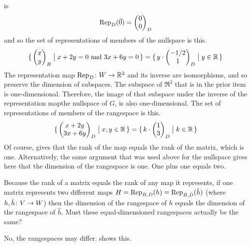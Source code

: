\begin{exercises}
\begin{answer}
\begin{exparts}
           is 
           \begin{equation*}
             \rep{\zero}{D}=\colvec{0 \\ 0}_D
           \end{equation*}
           and so the set of representations of members of the nullspace is
           this.
           \begin{equation*}
             \set{\colvec{x \\ y}_B\suchthat \text{$x+2y=0$ and $3x+6y=0$}}
             =\set{y\cdot\colvec{-1/2 \\ 1}_D\suchthat y\in\Re}
           \end{equation*}
         \partsitem The representation map $\map{\mbox{Rep}_D}{W}{\Re^2}$
           and its inverse
           are isomorphisms, and so preserve the dimension of subspaces.
           The subspace of $\Re^2$ that is in the prior item is
           one-dimensional.
           Therefore, the image of that subspace under the inverse of the
           representation map\Dash the nullspace of $G$, 
           is also one-dimensional.
         \partsitem The set of representations of members of the rangespace is
           this.
           \begin{equation*}
             \set{\colvec{x+2y \\ 3x+6y}_D\suchthat x,y\in\Re}
             =\set{k\cdot\colvec{1 \\ 3}_D\suchthat k\in\Re}
           \end{equation*}
         \partsitem Of course,  gives that
           the rank of the map equals the rank of the matrix, which is one.
           Alternatively, the same argument that was used above for the 
           nullspace gives here that the dimension of the rangespace is one.
         \partsitem One plus one equals two. 
      \end{exparts}
    \end{answer}
  \recommended \item  
    Because
    the rank of a matrix equals the rank of any map it represents, if
    one matrix represents two different maps 
    \( H=\rep{h}{B,D}=\rep{\hat{h}}{\hat{B},\hat{D}} \) 
    (where \( \map{h,\hat{h}}{V}{W} \))
    then the dimension of the rangespace of
    \( h \) equals the dimension of the rangespace of \( \hat{h} \).
    Must these equal-dimensioned rangespaces actually be the same?
    \begin{answer}
      No, the rangespaces may differ.
       shows this.

\end{answer}
\end{exercises}
